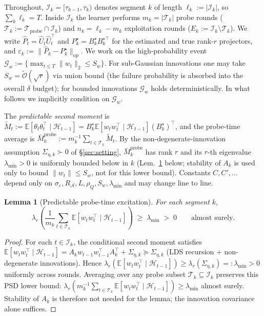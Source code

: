 \documentclass{article}
\newcommand{\E}{\mathbb{E}}
\newcommand{\op}{\mathrm{op}}
\newcommand{\cA}{\mathcal{A}}
\newcommand{\cH}{\mathcal{H}}
\newcommand{\cT}{\mathcal{T}}
\newcommand{\cI}{\mathcal{I}}
\newcommand{\cTprobe}{\mathcal{T}_{\mathrm{probe}}}
\newcommand{\tilO}{\widetilde{\mathcal{O}}}
\newtheorem{lemma}[theorem]{Lemma}
\begin{document}
Throughout, $\cI_k = [\tau_{k-1}, \tau_k)$ denotes segment $k$ of
length $\ell_k := |\cI_k|$, so $\sum_k \ell_k = T$. Inside $\cI_k$ the
learner performs $m_k = |\cT_k|$ probe rounds ($\cT_k := \cTprobe\cap\cI_k$)
and $n_k = \ell_k - m_k$ exploitation rounds ($E_k := \cI_k\setminus\cT_k$).
We write $\widehat P_t = \widehat U_t \widehat U_t^\top$ and
$P_k^\star = B_k^\star B_k^{\star\top}$ for the estimated and true rank-$r$
projectors, and $\varepsilon_k := \|\widehat P_k - P_k^\star\|_{\op}$.
We work on the high-probability event
$\mathcal G_w := \bigl\{\max_{t\le T}\|w_t\|_2\le S_w\bigr\}$. For sub-Gaussian innovations
one may take $S_w = \tilO(\sqrt r)$ via union bound (the failure
probability is absorbed into the overall $\delta$ budget); for bounded innovations $\mathcal G_w$ holds deterministically. In what
follows we implicitly condition on $\mathcal G_w$.

The \emph{predictable second moment} is
$\widetilde M_t := \E[\theta_t\theta_t^\top\mid\cH_{t-1}]
= B_k^\star \E[w_tw_t^\top\mid\cH_{t-1}](B_k^\star)^\top$, and the
probe-time average is
$\bar M_k^{\mathrm{probe}} := m_k^{-1}\sum_{t\in\cT_k}\widetilde M_t$.
By the non-degenerate-innovation assumption $\Sigma_{\eta,k}\succ 0$ of
\S\ref{sec:setting}, $\bar M_k^{\mathrm{probe}}$ has rank $r$ and its
$r$-th eigenvalue $\lambda_{\min}>0$ is uniformly bounded below in
$k$ (Lem.~\ref{lem:probe_excitation_conf} below; stability of $A_k$
is used only to bound $\|w_t\|\le S_w$, not for this lower bound).
Constants $C,C',\ldots$ depend only on
$\sigma_\varepsilon, R_\cA, L, \rho_Q, S_w, \lambda_{\min}$ and may
change line to line.

\begin{lemma}[Predictable probe-time excitation]
\label{lem:probe_excitation_conf}
For each segment $k$,
\[
\lambda_r\!\left(\frac{1}{m_k}\sum_{t\in\cT_k}\E[w_tw_t^\top\mid\cH_{t-1}]\right)
\;\ge\; \lambda_{\min}\;>\;0
\qquad\text{almost surely.}
\]
\end{lemma}
\begin{proof}
For each $t\in\cI_k$, the conditional second moment satisfies
$\E[w_t w_t^\top\mid\cH_{t-1}]
= A_k w_{t-1}w_{t-1}^\top A_k^\top + \Sigma_{\eta,k}
\succeq \Sigma_{\eta,k}$
(LDS recursion + non-degenerate innovations). Hence
$\lambda_r(\E[w_tw_t^\top\mid\cH_{t-1}]) \ge \lambda_r(\Sigma_{\eta,k}) =: \lambda_{\min} > 0$
uniformly across rounds. Averaging over any probe subset
$\cT_k\subseteq\cI_k$ preserves this PSD lower bound:
$\lambda_r(m_k^{-1}\sum_{t\in\cT_k}\E[w_tw_t^\top\mid\cH_{t-1}])\ge\lambda_{\min}$
almost surely. Stability of $A_k$ is therefore not needed for the
lemma; the innovation covariance alone suffices.
\end{proof}
\end{document}
